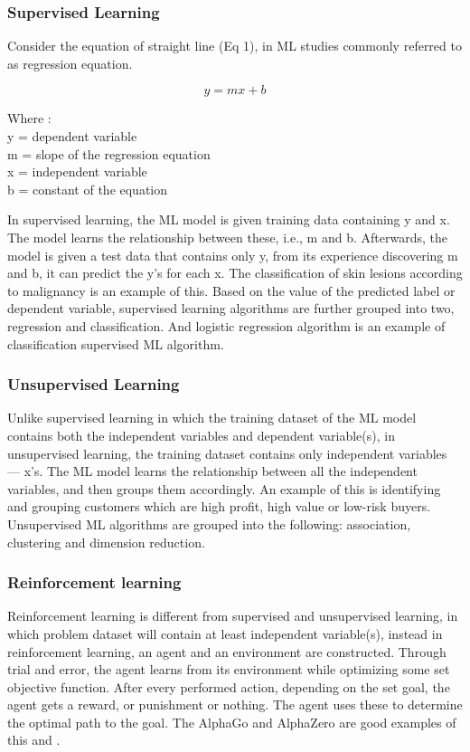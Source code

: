 \documentclass[conference]{IEEEtran}
\begin{document}
\subsubsection{Supervised Learning}
Consider the equation of straight line (Eq 1), in ML studies commonly referred to as regression equation.
               
\begin{equation} 
\label{equ1}
y = mx+b 
\end{equation} 

Where :\\
y = dependent variable \\
m = slope of the regression equation\\
x = independent variable\\
b = constant of the equation

In supervised learning, the ML model is given training data containing y and x. The model learns the relationship between these, i.e., m and b. Afterwards, the model is given a test data that contains only y, from its experience discovering m and b, it can predict the y’s for each x. The classification of skin lesions according to malignancy is an example of this.\cite{bb3} Based on the value of the predicted label or dependent variable, supervised learning algorithms are further grouped into two, regression and classification. And logistic regression algorithm is an example of classification supervised ML algorithm.\\

\subsubsection{Unsupervised Learning}
Unlike supervised learning in which the training dataset of the ML model contains both the independent variables and dependent variable(s), in unsupervised learning, the training dataset contains only independent variables — x’s. The ML model learns the relationship between all the independent variables, and then groups them accordingly. An example of this is identifying and grouping customers which are high profit, high value or low-risk buyers.\cite{bb4} Unsupervised ML algorithms are grouped into the following: association, clustering and dimension reduction.

\subsubsection{Reinforcement learning}
Reinforcement learning is different from supervised and unsupervised learning, in which problem dataset will contain at least independent variable(s), instead in reinforcement learning, an agent and an environment are constructed. Through trial and error, the agent learns from its environment while optimizing some set objective function. After every performed action, depending on the set goal, the agent gets a reward, or punishment or nothing. The agent uses these to determine the optimal path
to the goal. The AlphaGo and AlphaZero are good examples of this \cite{bb3} and \cite{bb5}.
\end{document}
